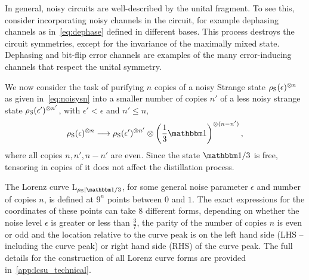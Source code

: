 \documentclass[pra,
aps,
twocolumn,
superscriptaddress,
groupedaddress,
nofootinbib,
reprint
]{revtex4-1}
\begin{document}
In general, noisy circuits are well-described by the unital fragment.
To see this, consider incorporating noisy channels in the circuit, for example dephasing channels as in~\cref{eq:dephase} defined in different bases.
This process destroys the circuit symmetries, except for the invariance of the maximally mixed state.
Dephasing and bit-flip error channels are examples of the many error-inducing channels that respect the unital symmetry. 

We now consider the task of purifying $n$ copies of a noisy Strange state $\rho_{\rm{S}}(\epsilon)^{\otimes n}$ as given in~\cref{eq:noisysn} into a smaller number of copies $n'$ of a less noisy strange state $\rho_{\rm{S}}(\epsilon')^{\otimes n'}$, with $\epsilon' < \epsilon$ and $n' \leq n$,
\begin{equation}\label{eq:sudist}
	\rho_{\rm{S}}(\epsilon)^{\otimes n} \longrightarrow \rho_{\rm{S}}(\epsilon')^{\otimes n'} \otimes \left( \frac{1}{3}\id \right)^{\otimes (n-n')},
\end{equation}
where all copies $n, n', n - n'$ are even.
Since the state $\id / 3$ is free, tensoring in copies of it does not affect the distillation process.

The Lorenz curve $\lc{\rho_{\rm{S}}}{\id/3}$, for some general noise parameter $\epsilon$ and number of copies $n$, is defined at $9^n$ points between $0$ and $1$.
The exact expressions for the coordinates of these points can take $8$ different forms, depending on whether the noise level  $\epsilon$ is greater or less than $\frac{3}{7}$, the parity of the number of copies $n$ is even or odd and the location relative to the curve peak is on the left hand side (LHS -- including the curve peak) or right hand side (RHS) of the curve peak.
The full details for the construction of all Lorenz curve forms are provided in~\cref{app:lcsu_technical}.

\end{document}
